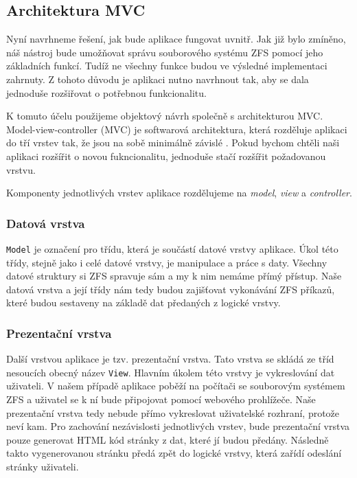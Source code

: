     \subsection{Architektura MVC}
    Nyní navrhneme řešení, jak bude aplikace fungovat uvnitř. Jak již bylo zmíněno, náš nástroj bude umožňovat správu souborového systému ZFS pomocí jeho základních funkcí. Tudíž ne všechny funkce budou ve výsledné implementaci zahrnuty. Z tohoto důvodu je aplikaci nutno navrhnout tak, aby se dala jednoduše rozšiřovat o potřebnou funkcionalitu.

    K tomuto účelu použijeme objektový návrh společně s architekturou MVC. Model-view-controller (MVC) je softwarová architektura, která rozděluje aplikaci do tří vrstev tak, že jsou na sobě minimálně závislé \cite{mvc}. Pokud bychom chtěli naši aplikaci rozšířit o novou fukncionalitu, jednoduše stačí rozšířit požadovanou vrstvu.

    Komponenty jednotlivých vrstev aplikace rozdělujeme na \emph{model}, \emph{view} a \emph{controller}.

        \subsubsection{Datová vrstva}
        \verb|Model| je označení pro třídu, která je součástí datové vrstvy aplikace. Úkol této třídy, stejně jako i celé datové vrstvy, je manipulace a práce s daty. Všechny datové struktury si ZFS spravuje sám a my k nim nemáme přímý přístup. Naše datová vrstva a její třídy nám tedy budou zajišťovat vykonávání ZFS příkazů, které budou sestaveny na základě dat předaných z logické vrstvy.
        \subsubsection{Prezentační vrstva}
        Další vrstvou aplikace je tzv. prezentační vrstva. Tato vrstva se skládá ze tříd nesoucích obecný název \verb|View|. Hlavním úkolem této vrstvy je vykreslování dat uživateli. V našem případě aplikace poběží na počítači se souborovým systémem ZFS a uživatel se k ní bude připojovat pomocí webového prohlížeče. Naše prezentační vrstva tedy nebude přímo vykreslovat uživatelské rozhraní, protože neví kam. Pro zachování nezávislosti jednotlivých vrstev, bude prezentační vrstva pouze generovat HTML kód stránky z dat, které jí budou předány. Následně takto vygenerovanou stránku předá zpět do logické vrstvy, která zařídí odeslání stránky uživateli.
